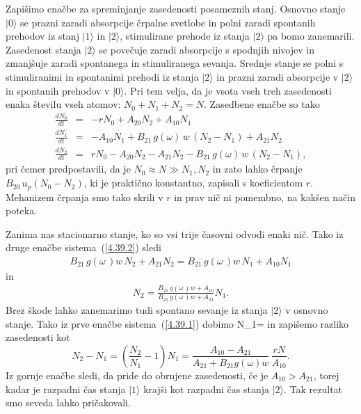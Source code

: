 Zapišimo enačbe za spreminjanje zasedenosti posameznih stanj. Osnovno stanje
$|0\rangle$ se prazni zaradi absorpcije črpalne svetlobe in polni zaradi
spontanih prehodov iz stanj $|1\rangle$ in $|2\rangle$, stimulirane
prehode iz stanja $|2\rangle$ pa bomo zanemarili. Zasedenost stanja $|2\rangle$ se
povečuje zaradi absorpcije s spodnjih nivojev in zmanjšuje
zaradi spontanega in stimuliranega sevanja. Srednje stanje se polni
s stimuliranimi in spontanimi prehodi iz stanja $|2\rangle$ in prazni
zaradi absorpcije v $|2\rangle$ in spontanih prehodov v $|0\rangle$.
Pri tem velja, da je vsota vseh treh zasedenosti enaka številu vseh atomov: $N_{0}+N_{1}+N_{2}=N$. 
Zasedbene enačbe so tako
\begin{eqnarray}
\frac{dN_{0}}{dt} & = & -rN_0+A_{20}N_{2}+A_{10}N_{1} \label{4.39.1}\\
\frac{dN_{1}}{dt} & = & -A_{10}N_{1}+B_{21}\,g(\omega)\,w\, (N_{2}-N_{1})+A_{21}N_{2} \label{4.39.2}\\
\frac{dN_{2}}{dt} & = & rN_0-A_{20}N_{2}-A_{21}N_{2}-B_{21}\,g(\omega)\,w\, (N_2-N_1),
\label{4.39}
\end{eqnarray}
pri čemer predpostavili, da je $N_0 \approx N \gg N_1, N_2$ in zato lahko črpanje $B_{20}\, 
u_{p} (N_0-N_2)$, ki je praktično konstantno, zapisali s koeficientom $r$. Mehanizem črpanja 
smo tako skrili v $r$ in prav nič ni pomembno, na kakšen način poteka.

Zanima nas stacionarno stanje, ko so vsi trije časovni odvodi enaki nič. 
Tako iz druge enačbe sistema~(\ref{4.39.2}) sledi
\begin{eqnarray}
B_{21}\,g(\omega\,)w\, N_{2}+A_{21}N_{2} = B_{21}\,g(\omega\,)w\, N_{1} + A_{10}N_{1} 
\end{eqnarray}
in
\begin{eqnarray}
N_2 = \frac{B_{21}\,g(\omega\,)w + A_{10}}{B_{21}\,g(\omega\,)w+A_{21}}N_1.  
\end{eqnarray}
Brez škode lahko zanemarimo tudi spontano sevanje iz stanja
$|2\rangle$ v osnovno stanje. Tako iz prve enačbe sistema~(\ref{4.39.1}) dobimo 
\beq
N_1= 
\eeq
in zapišemo razliko zasedenosti kot 
\begin{equation}
N_{2}-N_{1}=\left(\frac{N_2}{N_1}-1\right)N_1=\frac{A_{10}-A_{21}}{A_{21}+
B_{21}g(\omega)w} \,\frac{rN}{A_{10}}.
\label{4.42}
\end{equation}
Iz gornje enačbe sledi, da pride do obrnjene zasedenosti, če je $A_{10}>A_{21}$, torej kadar je
razpadni čas stanja $|1\rangle$ krajši kot razpadni čas stanja $|2\rangle$.
Tak rezultat smo seveda lahko pričakovali.

